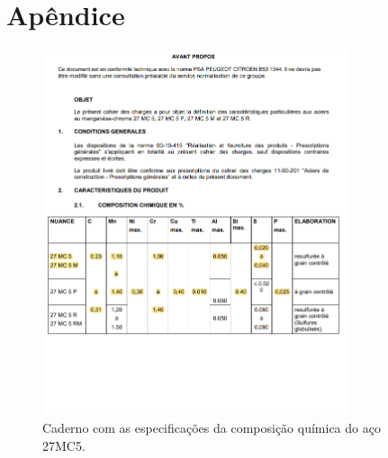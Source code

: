 \setlength{\headheight}{13.9pt}
\chapter{Apêndice} \label{ap:ap1}
\begin{figure}[htpb]
    \centering
    \includegraphics[width=0.8\textwidth]{Figures/Apendix/Chemical_Comp_Coroa.png}
    \caption{Caderno com as especificações da composição química do aço 27MC5.}
    \label{fig:chemical_comp_coroa}
\end{figure}
\newpage
